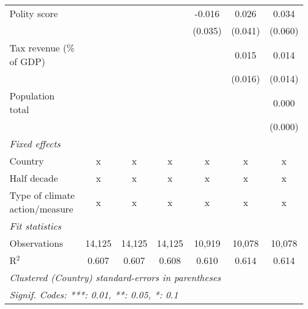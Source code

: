 \begin{tabular}{lcccccc}
   Polity score                                                &         &               &                & -0.016         & 0.026          & 0.034\\   
                                                               &         &               &                & (0.035)        & (0.041)        & (0.060)\\   
   Tax revenue (\% of GDP)                                     &         &               &                &                & 0.015          & 0.014\\   
                                                               &         &               &                &                & (0.016)        & (0.014)\\   
   Population total                                            &         &               &                &                &                & 0.000\\   
                                                               &         &               &                &                &                & (0.000)\\   
   \emph{Fixed effects}\\
   Country                                                     & x       & x             & x              & x              & x              & x\\  
   Half decade                                                 & x       & x             & x              & x              & x              & x\\  
   Type of climate action/measure                              & x       & x             & x              & x              & x              & x\\  
   \midrule \emph{Fit statistics}\\
   Observations                                                & 14,125  & 14,125        & 14,125         & 10,919         & 10,078         & 10,078\\  
   R$^2$                                                       & 0.607   & 0.607         & 0.608          & 0.610          & 0.614          & 0.614\\  
   \midrule
   \multicolumn{7}{l}{\emph{Clustered (Country) standard-errors in parentheses}}\\
   \multicolumn{7}{l}{\emph{Signif. Codes: ***: 0.01, **: 0.05, *: 0.1}}\\
\end{tabular}
\par\endgroup


